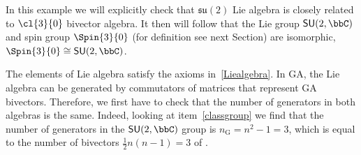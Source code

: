 %
\begin{example}%
In this example we will explicitly check that $\mathfrak{su}(2)$
Lie algebra is closely related to $\cl{3}{0}$ bivector algebra.
 It then will follow that the Lie
group $\mathsf{SU}(2,\bbC)$ and spin group $\Spin{3}{0}$ (for
definition see next Section) are isomorphic,
$\Spin{3}{0}\cong\mathsf{SU}(2,\bbC)$.

The elements of Lie algebra satisfy the axioms
in~\ref{Liealgebra}. In GA, the Lie algebra can be generated by
commutators of matrices that represent GA bivectors. Therefore, we
first have to check that the number of generators in both algebras
is the same. Indeed, looking at item~\ref{classgroup} we find
that the number of generators in the $\mathsf{SU}(2,\bbC)$ group 
is $n_{\mathrm{G}}=n^2-1=3$, which is equal to the number of
bivectors  $\tfrac{1}{2}n(n-1)=3$ of .


\end{example}
